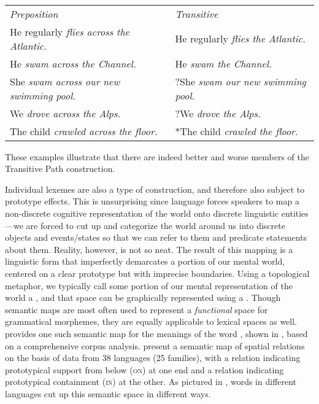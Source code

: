 \begin{exe}
  \ex\label{ex:2.21}
  \hspace{0.5em}\\
  \begin{tabular}[t]{ l l }
    \textit{Preposition}                         & \textit{Transitive}\\
    He regularly \em{flies across} the Atlantic. & He regularly \em{flies} the Atlantic.\\
    He \em{swam across} the Channel.             & He \em{swam} the Channel.\\
    She \em{swam across} our new swimming pool.  & ?She \em{swam} our new swimming pool.\\
    We \em{drove across} the Alps.               & ?We \em{drove} the Alps.\\
    The child \em{crawled across} the floor.     & *The child \em{crawled} the floor.\\
  \end{tabular}
  \vspace{0.5em}
\end{exe}

\noindent These examples illustrate that there are indeed better and worse members of the  Transitive Path construction.

Individual lexemes are also a type of construction, and therefore also subject to prototype effects. This is unsurprising since language forces speakers to map a non-discrete cognitive representation of the world onto discrete linguistic entities—we are forced to cut up and categorize the world around us into discrete objects and events/states so that we can refer to them and predicate statements about them. Reality, however, is not so neat. The result of this mapping is a linguistic form that imperfectly demarcates a portion of our mental world, centered on a clear prototype but with imprecise boundaries. Using a topological metaphor, we typically call some portion of our mental representation of the world a  \parencites[140]{Finch2003}, and that space can be graphically represented using a  \parencites[§2.4.3]{Croft2001b}{Haspelmath2003}. Though semantic maps are most often used to represent a \emph{functional} space for grammatical morphemes, they are equally applicable to lexical spaces as well. \textcite[74]{Gries2006} provides one such semantic map for the meanings of the  word , shown in , based on a comprehensive corpus analysis. \textcite[485]{BowermanChoi2001} present a semantic map of spatial relations on the basis of data from 38 languages (25 families), with a relation indicating prototypical support from below (\textsc{on}) at one end and a relation indicating prototypical containment (\textsc{in}) at the other. As pictured in , words in different languages cut up this semantic space in different ways.

